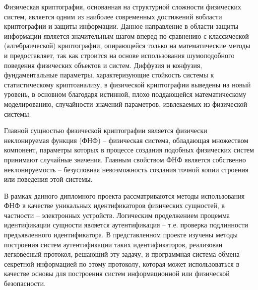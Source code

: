 \label{sec:intro}

Физическая криптография, основанная на структурной сложности физических систем, является одним из наиболее современных достижений вобласти криптографии и защиты информации. Данное направление в области защиты информации является значительным шагом вперед по сравнению с классической (алгебраической) криптографии, опирающейся только на математические методы и предоставляет, так как строится на основе использования шумоподобного поведения физических объектов и систем. Диффузия и конфузия, фундаментальные параметры,  характеризующие стойкость системы к статистическому криптоанализу, в физической криптографии выведены на новый уровень, в основном благодаря истинной, плохо поддающейся математическому моделированию, случайности значений параметров, извлекаемых из физической системы.

Главной сущностью физической криптографии является физически неклонируемая функция (ФНФ) -- физическая система, обладающая множеством компонент, параметры которых в процессе создания подобных физических систем принимают случайные значения. Главным свойством ФНФ является собственно неклонируемость -- безусловная невозможность создания точной копии строения или поведения этой системы.

В рамках данного дипломного проекта рассматриваются методы использования ФНФ в качестве уникальных идентификаторов физических сущностей, в частности -- электронных устройств. Логическим проделжением процемма идентификации сущности является аутентификация -- т.е. проверка подлинности предъявленного идентификатора. В представленном проекте изучены методы построения систем аутентификации таких идентификаторов, реализован легковесный протокол, решающий эту задачу, и программная система обмена секретной информацией по этому протоколу, которая может использоваться в качестве основы для построения систем информационной или физической безопасности.
